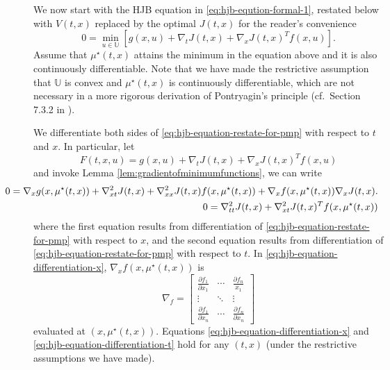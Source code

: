 \documentclass[
]{book}
\theoremstyle{definition}
\theoremstyle{definition}
\theoremstyle{definition}
\theoremstyle{definition}
\theoremstyle{remark}
\begin{document}
We now start with the HJB equation in \eqref{eq:hjb-eqution-formal-1}, restated below with \(V(t,x)\) replaced by the optimal \(J(t,x)\) for the reader's convenience
\begin{equation}
0 = \min_{u \in \mathbb{U}} \left[ g(x,u) + \nabla_t J(t,x) + \nabla_x J(t,x)^Tf(x,u)  \right].
\label{eq:hjb-equation-restate-for-pmp}
\end{equation}
Assume that \(\mu^\star(t,x)\) attains the minimum in the equation above and it is also continuously differentiable. Note that we have made the restrictive assumption that \(\mathbb{U}\) is convex and \(\mu^\star(t,x)\) is continuously differentiable, which are not necessary in a more rigorous derivation of Pontryagin's principle (cf.~Section 7.3.2 in \citep{bertsekas12book-dpocI}).

We differentiate both sides of \eqref{eq:hjb-equation-restate-for-pmp} with respect to \(t\) and \(x\). In particular, let
\[
F(t,x,u) = g(x,u) + \nabla_t J(t,x) + \nabla_x J(t,x)^T f(x,u)
\]
and invoke Lemma \ref{lem:gradientofminimumfunctions}, we can write
\begin{align}
\label{eq:hjb-equation-differentiation-x}
\hspace{-12mm}
0 = \nabla_x g(x, \mu^\star(t,x)) + \nabla^2_{xt} J(t,x) + \nabla^2_{xx} J(t,x)f(x,\mu^\star(t,x)) + \nabla_x f(x,\mu^\star(t,x)) \nabla_x J(t,x).\\
\hspace{-12mm} 0 = \nabla^2_{tt}J(t,x) + \nabla_{xt}^2 J(t,x)^T f(x,\mu^\star(t,x)) 
\label{eq:hjb-equation-differentiation-t}
\end{align}
where the first equation results from differentiation of \eqref{eq:hjb-equation-restate-for-pmp} with respect to \(x\), and the second equation results from differentiation of \eqref{eq:hjb-equation-restate-for-pmp} with respect to \(t\). In \eqref{eq:hjb-equation-differentiation-x}, \(\nabla_x f(x,\mu^\star(t,x))\) is
\[
\nabla_f = \begin{bmatrix}
\frac{\partial f_1}{\partial x_1} & \cdots & \frac{\partial f_n}{x_1} \\
\vdots & \ddots & \vdots \\
\frac{\partial f_1}{\partial x_n} & \cdots & \frac{\partial f_n}{\partial x_n}
\end{bmatrix}
\]
evaluated at \((x,\mu^\star(t,x))\).
Equations \eqref{eq:hjb-equation-differentiation-x} and \eqref{eq:hjb-equation-differentiation-t} hold for any \((t,x)\) (under the restrictive assumptions we have made).
\end{document}
